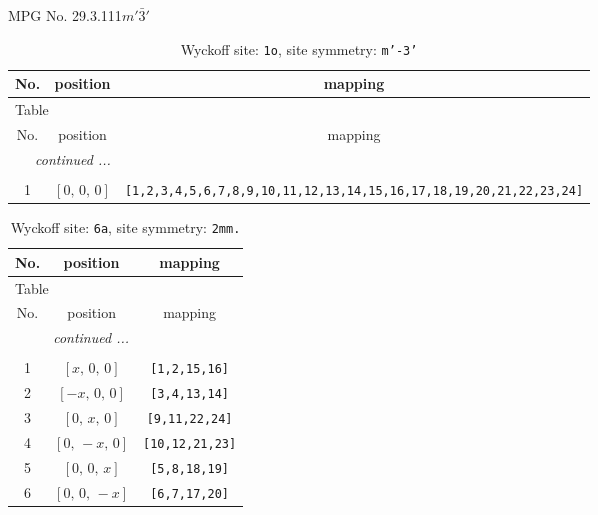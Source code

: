 \documentclass[fleqn,8pt]{jsarticle}
\begin{document}
\setcounter{MaxMatrixCols}{32}

\renewcommand{\tablename}{Table~}
\renewcommand{\figurename}{Figure~}
\begin{center}
\LARGE
MPG No. 29.3.111\quad$m'\bar{3}'$
\end{center}
\renewcommand{\arraystretch}{1.2}
\begin{longtable}{ccc}
\caption{Wyckoff site: {\tt 1o}, site symmetry: {\tt m'-3'}}
 \\
 \hline \hline
No. & position & mapping \\ \hline \endfirsthead

\multicolumn{2}{l}{\tablename\ \thetable{}} \\
 \hline \hline
No. & position & mapping \\ \hline \endhead

 \hline \hline
\multicolumn{2}{r}{\footnotesize\it continued ...} \\ \endfoot

 \hline \hline
\multicolumn{2}{r}{} \\ \endlastfoot

1 & $\left[ 0,\, 0,\, 0 \right]$ & {\tt [1,2,3,4,5,6,7,8,9,10,11,12,13,14,15,16,17,18,19,20,21,22,23,24]} \\
\end{longtable}
\renewcommand{\arraystretch}{1.2}
\begin{longtable}{ccc}
\caption{Wyckoff site: {\tt 6a}, site symmetry: {\tt 2mm.}}
 \\
 \hline \hline
No. & position & mapping \\ \hline \endfirsthead

\multicolumn{2}{l}{\tablename\ \thetable{}} \\
 \hline \hline
No. & position & mapping \\ \hline \endhead

 \hline \hline
\multicolumn{2}{r}{\footnotesize\it continued ...} \\ \endfoot

 \hline \hline
\multicolumn{2}{r}{} \\ \endlastfoot

1 & $\left[ x,\, 0,\, 0 \right]$ & {\tt [1,2,15,16]} \\ \hline
2 & $\left[ - x,\, 0,\, 0 \right]$ & {\tt [3,4,13,14]} \\ \hline
3 & $\left[ 0,\, x,\, 0 \right]$ & {\tt [9,11,22,24]} \\ \hline
4 & $\left[ 0,\, - x,\, 0 \right]$ & {\tt [10,12,21,23]} \\ \hline
5 & $\left[ 0,\, 0,\, x \right]$ & {\tt [5,8,18,19]} \\ \hline
6 & $\left[ 0,\, 0,\, - x \right]$ & {\tt [6,7,17,20]} \\
\end{longtable}
\end{document}
